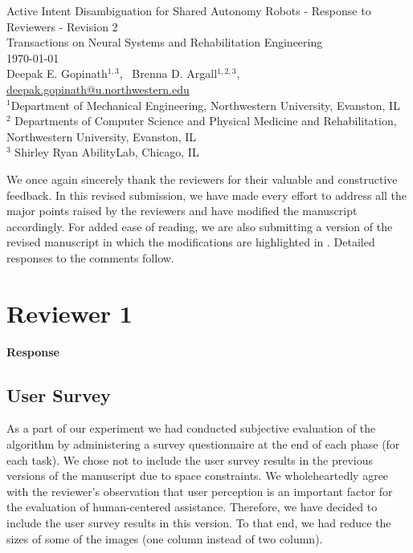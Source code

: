 \documentclass[a4paper,twoside,11pt]{reviewresponse}
\makeatletter
\newcommand{\myAuthors}{{Deepak E. Gopinath$^{\displaystyle 1, 3}$, ~Brenna D. Argall$^{\displaystyle 1,2,3}$, }}
\newcommand{\myEmail}{deepak.gopinath@u.northwestern.edu}
\newcommand{\myTitle}{Active Intent Disambiguation for Shared Autonomy Robots - Response to Reviewers - Revision 2}
\newcommand{\myJournal}{Transactions on Neural Systems and Rehabilitation Engineering}
\newcommand{\myDept}{{$^{\displaystyle 1}$Department of Mechanical Engineering, Northwestern University, Evanston, IL}\\
{$^{\displaystyle 2}$ Departments of Computer Science and Physical Medicine and Rehabilitation, Northwestern University, Evanston, IL  }\\
{$^{\displaystyle 3}$ Shirley Ryan AbilityLab, Chicago, IL }\\}
\makeatother
\begin{document}
\thispagestyle{plain}

\begin{center}
 {\LARGE\myTitle} \vspace{0.5cm} \\
 {\large\myJournal} \vspace{0.5cm} \\
 \today \vspace{0.5cm} \\
 \myAuthors \\
 \url{\myEmail} \vspace{1cm} \\
 \myDept
\end{center}



We once again sincerely thank the reviewers for their valuable and constructive feedback. In this revised submission, we have made every effort to address all the major points raised by the reviewers and have modified the manuscript accordingly. For added ease of reading, we are also submitting a version of the revised manuscript in which the modifications are highlighted in . Detailed responses to the comments follow.  

\section{Reviewer 1}


\textbf{Response}

\subsection{User Survey}
As a part of our experiment we had conducted subjective evaluation of the algorithm by administering a survey questionnaire at the end of each phase (for each task). We chose not to include the user survey results in the previous versions of the manuscript due to space constraints. We wholeheartedly agree with the reviewer's observation that user perception is an important factor for the evaluation of human-centered assistance. Therefore, we have decided to include the user survey results in this version. To that end, we had reduce the sizes of some of the images (one column instead of two column). 
\end{document}
